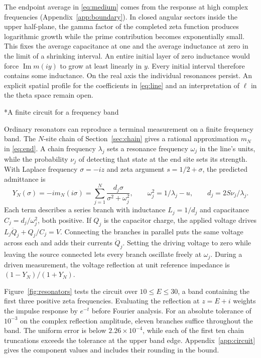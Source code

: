 \documentclass[11pt,letterpaper]{article}
\makeatletter
\renewcommand\subsection{\@startsection{subsection}{2}{\z@}{-2.0ex plus -.3ex}{.75ex}{\normalfont\normalsize\itshape}}
\numberwithin{equation}{section}
\makeatother
\begin{document}
The endpoint average in \eqref{eq:medium} comes from the response at high complex frequencies (Appendix~\ref{app:boundary}). In closed angular sectors inside the upper half-plane, the gamma factor of the completed zeta function produces logarithmic growth while the prime contribution becomes exponentially small. This fixes the average capacitance at one and the average inductance at zero in the limit of a shrinking interval. An entire initial layer of zero inductance would force $\operatorname{Im}m(iy)$ to grow at least linearly in $y$. Every initial interval therefore contains some inductance. On the real axis the individual resonances persist. An explicit spatial profile for the coefficients in \eqref{eq:line} and an interpretation of $\ell$ in the theta space remain open.

\subsection*{A finite circuit for a frequency band}

Ordinary resonators can reproduce a terminal measurement on a finite frequency band. The $N$-site chain of Section~\ref{sec:chain} gives a rational approximation $m_N$ in \eqref{eq:end}. A chain frequency $\lambda_j$ sets a resonance frequency $\omega_j$ in the line's units, while the probability $\nu_j$ of detecting that state at the end site sets its strength. With Laplace frequency $\sigma=-iz$ and zeta argument $s=1/2+\sigma$, the predicted admittance is
\begin{equation}
 Y_N(\sigma)=-i m_N(i\sigma)=\sum_{j=1}^N\frac{d_j\sigma}{\sigma^2+\omega_j^2},
 \qquad \omega_j^2=1/\lambda_j-u,\qquad d_j=2S\nu_j/\lambda_j .
 \label{eq:branches}
\end{equation}
Each term describes a series branch with inductance $L_j=1/d_j$ and capacitance $C_j=d_j/\omega_j^2$, both positive. If $Q_j$ is the capacitor charge, the applied voltage drives $L_j\ddot Q_j+Q_j/C_j=V$. Connecting the branches in parallel puts the same voltage across each and adds their currents $\dot Q_j$. Setting the driving voltage to zero while leaving the source connected lets every branch oscillate freely at $\omega_j$. During a driven measurement, the voltage reflection at unit reference impedance is $(1-Y_N)/(1+Y_N)$.

Figure~\ref{fig:resonators} tests the circuit over $10\le E\le30$, a band containing the first three positive zeta frequencies. Evaluating the reflection at $z=E+i$ weights the impulse response by $e^{-t}$ before Fourier analysis. For an absolute tolerance of $10^{-3}$ on the complex reflection amplitude, eleven branches suffice throughout the band. The uniform error is below $2.26\times10^{-4}$, while each of the first ten chain truncations exceeds the tolerance at the upper band edge. Appendix~\ref{app:circuit} gives the component values and includes their rounding in the bound.
\end{document}
